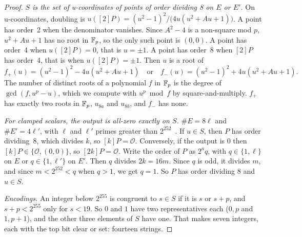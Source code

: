 \begin{proof}
\emph{$S$ is the set of u-coordinates of points of order dividing 8 on $E$ or
$E'$.} On u-coordinates, doubling is
$u([2]P) = (u^2 - 1)^2 / \bigl(4u(u^2 + Au + 1)\bigr)$. A point has order~2
when the denominator vanishes. Since $A^2 - 4$ is a non-square mod $p$,
$u^2 + Au + 1$ has no root in $\mathbb{F}_p$, so the only such point is $(0,0)$. A
point has order~4 when $u([2]P) = 0$, that is $u = \pm 1$. A point has
order~8 when $[2]P$ has order~4, that is when $u([2]P) = \pm 1$. Then $u$ is a
root of
\[
  f_{+}(u) = (u^2-1)^2 - 4u(u^2+Au+1) \quad\text{or}\quad
  f_{-}(u) = (u^2-1)^2 + 4u(u^2+Au+1).
\]
The number of distinct roots of a polynomial $f$ in $\mathbb{F}_p$ is the degree of
$\gcd(f, u^p - u)$, which we compute with $u^p \bmod f$ by square-and-multiply.
$f_{+}$ has exactly two roots in $\mathbb{F}_p$, $u_{8a}$ and $u_{8b}$, and $f_{-}$ has
none.

\emph{For clamped scalars, the output is all-zero exactly on $S$.}
$\#E = 8\ell$ and $\#E' = 4\ell'$, with $\ell$ and $\ell'$ primes greater
than $2^{252}$~\cite{Ber06}. If $u \in S$, then $P$ has order dividing~8,
which divides $k$, so $[k]P = \mathcal{O}$. Conversely, if the output is 0
then $[k]P \in \{\mathcal{O}, (0,0)\}$, so $[2k]P = \mathcal{O}$. Write the
order of $P$ as $2^a q$, with $q \in \{1, \ell\}$ on $E$ or $q \in \{1, \ell'\}$
on $E'$. Then $q$ divides $2k = 16m$. Since $q$ is odd, it divides $m$, and
since $m < 2^{252} < q$ when $q > 1$, we get $q = 1$. So $P$ has order
dividing 8 and $u \in S$.

\emph{Encodings.} An integer below $2^{255}$ is congruent to $s \in S$ if it
is $s$ or $s + p$, and $s + p < 2^{255}$ only for $s < 19$. So $0$ and $1$ have
two representatives each ($0, p$ and $1, p+1$), and the other three elements
of $S$ have one. That makes seven integers, each with the top bit clear or
set: fourteen strings.
\end{proof}

